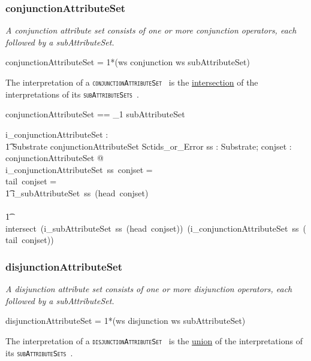 \documentclass{article}
\def\spec#1{{\tt \small \textsc{{#1}} }}
\def\bnf#1{{\scriptsize {{#1}} }}
\def\desc#1{{\small \textsl{{#1}} }}
\begin{document}
\subsubsection{conjunctionAttributeSet}
\begin{framed}
\desc{A conjunction attribute set consists of one or more conjunction operators, each followed by a subAttributeSet.}
\end{framed}
\begin{framed}
\noindent
\bnf{conjunctionAttributeSet = 1*(ws conjunction ws subAttributeSet)}
\end{framed}

The interpretation of a \spec{conjunctionAttributeSet } is the \underline{intersection} of the interpretations of its \spec{subAttributeSets}.


\begin{zed}
conjunctionAttributeSet ==  \seq_1 subAttributeSet 
\end{zed}

\begin{axdef}
    i\_conjunctionAttributeSet : \\
\t1 Substrate \fun conjunctionAttributeSet \fun Sctids\_or\_Error
\where
   \forall ss : Substrate;  conjset : conjunctionAttributeSet @ \\
   i\_conjunctionAttributeSet~ss~conjset = ~ \\
   \IF tail~conjset = \langle \rangle  \THEN \\
   \t1 i\_subAttributeSet~ss~(head~conjset) \\
\ELSE \\
\t1 intersect~(i\_subAttributeSet~ss~(head~conjset))~(i\_conjunctionAttributeSet~ss~(tail~conjset))
\end{axdef}


\subsubsection{disjunctionAttributeSet}
\begin{framed}
\desc{A disjunction attribute set consists of one or more disjunction operators, each followed by a subAttributeSet.}
\end{framed}
\begin{framed}
\noindent
\bnf{disjunctionAttributeSet = 1*(ws disjunction ws subAttributeSet)}
\end{framed}

The interpretation of a \spec{disjunctionAttributeSet } is the \underline{union} of the interpretations of its \spec{subAttributeSets}.
\end{document}
